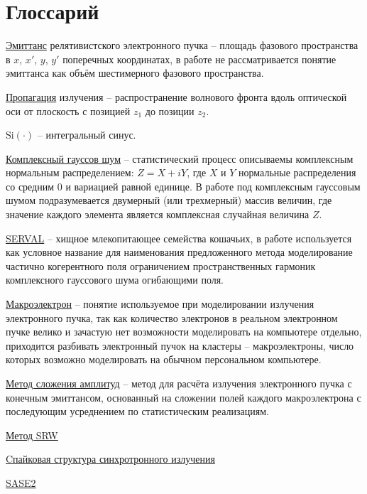 \chapter*{Глоссарий}\label{glossarium}

\noindent \underline{Эмиттанс} релятивистского электронного пучка -- площадь фазового пространства в $x$, $x'$, $y$, $y'$ поперечных координатах, в работе не рассматривается понятие эмиттанса как объём шестимерного фазового пространства.

\noindent \underline{Пропагация} излучения -- распространение волнового фронта  вдоль оптической оси  от плоскость с позицией $z_1$ до позиции $z_2$.

\noindent \underline{$\text{Si}(\cdot)$} -- интегральный синус.

\noindent \underline{Комплексный гауссов шум} -- статистический процесс описываемы комплексным нормальным распределением: $Z = X + iY$, где $X$ и $Y$ нормальные распределения со средним $0$ и вариацией равной единице. В работе под комплексным гауссовым шумом подразумевается двумерный (или трехмерный) массив величин, где значение каждого элемента является комплексная случайная величина $Z$.

\noindent \underline{SERVAL} -- хищное млекопитающее семейства кошачьих, в работе используется как условное название для наименования предложенного метода моделирование частично когерентного поля ограничением пространственных гармоник комплексного гауссового шума огибающими поля. 

\noindent \underline{Макроэлектрон} -- понятие используемое при моделировании излучения электронного пучка, так как количество электронов в реальном электронном пучке велико и зачастую нет возможности моделировать на компьютере отдельно, приходится разбивать электронный пучок на кластеры -- макроэлектроны, число которых возможно моделировать на обычном персональном компьютере.

\noindent \underline{Метод сложения амплитуд} -- метод для расчёта излучения электронного пучка с конечным эмиттансом, основанный на сложении полей каждого макроэлектрона с последующим усреднением по статистическим реализациям.

\noindent \underline{Метод SRW}

\noindent \underline{Cпайковая структура синхротронного излучения}

\noindent \underline{SASE2}


\newpage
